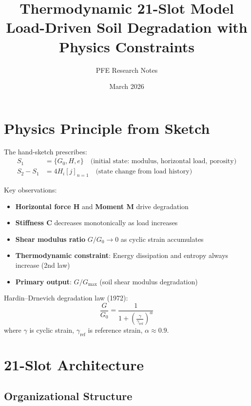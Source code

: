 \documentclass[12pt,a4paper]{article}
\title{\textbf{Thermodynamic 21-Slot Model}\\[0.3em]
\large Load-Driven Soil Degradation with Physics Constraints}
\author{PFE Research Notes}
\date{March 2026}
\begin{document}
\maketitle

\section{Physics Principle from Sketch}

The hand-sketch prescribes:
\begin{align}
  S_1 &= \{G_0, H, e\}  \quad \text{(initial state: modulus, horizontal load, porosity)}  \\
  S_2 - S_1 &= 4 H_i [j]_{n=1}  \quad \text{(state change from load history)}
\end{align}

Key observations:
\begin{itemize}
  \item \textbf{Horizontal force H} and \textbf{Moment M} drive degradation
  \item \textbf{Stiffness C} decreases monotonically as load increases
  \item \textbf{Shear modulus ratio} $G/G_0 \to 0$ as cyclic strain accumulates
  \item \textbf{Thermodynamic constraint}: Energy dissipation and entropy always increase (2nd law)
  \item \textbf{Primary output}: $G/G_{\max}$ (soil shear modulus degradation)
\end{itemize}

Hardin--Drnevich degradation law (1972):
\[
  \frac{G}{G_0} = \frac{1}{1 + \left(\frac{\gamma}{\gamma_{\text{ref}}}\right)^{\alpha}}
\]
where $\gamma$ is cyclic strain, $\gamma_{\text{ref}}$ is reference strain, $\alpha \approx 0.9$.

\section{21-Slot Architecture}

\subsection{Organizational Structure}
\end{document}
